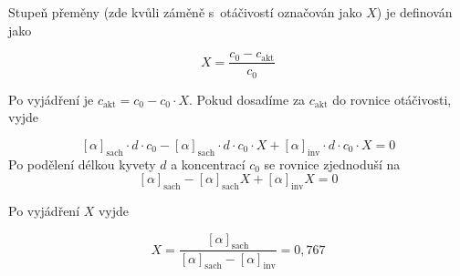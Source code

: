 \documentclass{book}
\begin{document}
Stupeň přeměny (zde kvůli záměně s~otáčivostí označován jako $X$)
je definován jako

\[
X=\frac{c_{0}-c_{\mathrm{akt} }}{c_{0}}
\]

Po vyjádření je $c_{\mathrm{akt}}=c_{0}-c_{0}\cdot X$. Pokud dosadíme za $c_{\mathrm{akt}}$
do rovnice otáčivosti, vyjde

\[
[\alpha]_{\mathrm{sach}}\cdot d\cdot c_{0}-[\alpha]_{\mathrm{sach}}\cdot d\cdot c_{0}\cdot X+[\alpha]_{\mathrm{inv}}\cdot d\cdot c_{0}\cdot X=0
\]
Po podělení délkou kyvety $d$ a koncentrací $c_{0}$ se rovnice zjednoduší
na 
\[
[\alpha]_{\mathrm{sach}}-[\alpha]_{\mathrm{sach}}X+[\alpha]_{\mathrm{inv}}X=0
\]

Po vyjádření $X$ vyjde

\[
X=\frac{[\alpha]_{\mathrm{sach}}}{[\alpha]_{\mathrm{sach}}-[\alpha]_{\mathrm{inv}}}=0,767
\]
\end{document}
